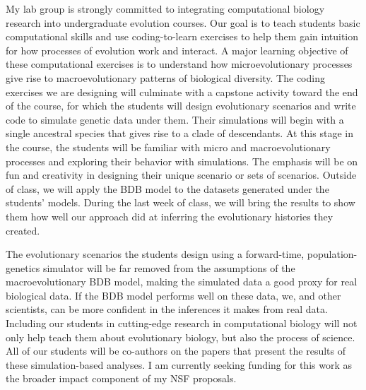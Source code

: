 My lab group is strongly committed to integrating computational biology
research into undergraduate evolution courses.
Our goal is to teach students basic computational skills and use
coding-to-learn exercises to help them gain intuition for how processes of
evolution work and interact.
A major learning objective of these computational exercises is to understand
how microevolutionary processes give rise to macroevolutionary patterns of
biological diversity.
The coding exercises we are designing will culminate with a capstone activity
toward the end of the course, for which the students will design evolutionary
scenarios and write code to simulate genetic data under them.
Their
simulations will begin with a single ancestral species
that gives rise to a clade of descendants.
At this stage in the course, the students will be familiar with
micro and macroevolutionary processes and exploring their behavior
with simulations.
The emphasis will be on fun and creativity in designing their unique scenario
or sets of scenarios.
Outside of class, we will apply the BDB model
to the datasets generated under the students' models.
During the last week of class, we will bring the results to show them how well
our approach did at inferring the evolutionary histories they created.

The evolutionary scenarios the students design
using a forward-time, population-genetics simulator
will be far removed from the assumptions
of the macroevolutionary BDB model,
making the simulated data a good proxy for real biological data.
If the BDB model performs well on these data, we, and other scientists, can be
more confident in the inferences it makes from real data.
Including our students in
cutting-edge research in computational biology will not only help
teach them about evolutionary biology, but also the process of science.
All of our students will be co-authors on the papers that present the results
of these simulation-based analyses.
I am currently seeking funding for this work as the broader impact component of
my NSF proposals.



